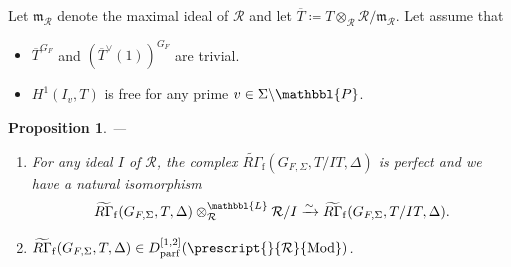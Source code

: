 \documentclass[10pt]{amsart}
\makeatletter
\numberwithin{equation}{section}
\newcommand{\mylabel}[2]{#2\def\@currentlabel{#2}\label{#1}}
\newtheorem{prop}[thm]{Proposition}
\theoremstyle{definition}
\theoremstyle{remark} %
\newcommand{\ba}{\backslash}
\newcommand{\bP}{\mathbbl{P}}
\newcommand{\R}{\mathcal{R}}
\makeatother
\begin{document}
	Let $ \mathfrak{m}_\R $ denote the maximal ideal of $ \R $ and let $ \overline{T}\coloneqq T \otimes_{\R} \R/\mathfrak{m}_\R $. Let assume that 
	\begin{itemize}
		\item[\mylabel{H=0}{\textbf{($ H^0 $)} }]$ \overline{T}^{G_F} $ and $( \overline{T}^\vee(1))^{G_F} $ are trivial. 
		\item[\mylabel{Tam}{\textbf{(Tam)}}]$ H^1(I_v,T) $ is free for any prime $ v \in \Sigma\ba \bP $.
	\end{itemize}
	\begin{prop} ---
		\label{dercat}
		\begin{enumerate}[(1)]
			\item For any ideal $ I $ of $ \R $, the complex $ \widetilde{R\Gamma}_{\mathrm{f}}(G_{F,\Sigma},T/IT, \Delta) $ is perfect and we have a natural isomorphism 
			$$ \widetilde{R\Gamma}_{\mathrm{f}}(G_{F,\Sigma},T, \Delta) \otimes^{\mathbbl{L}}_\R \R/I \xrightarrow{\sim} \widetilde{R\Gamma}_{\mathrm{f}}(G_{F,\Sigma},T/IT, \Delta).$$
			\item $ \widetilde{R\Gamma}_{\mathrm{f}}(G_{F,\Sigma},T, \Delta) \in D^{[1,2]}_{\mathrm{parf}}(\prescript{}{\R}{\mathrm{Mod}}) $.
		\end{enumerate}
	\end{prop}
\end{document}
